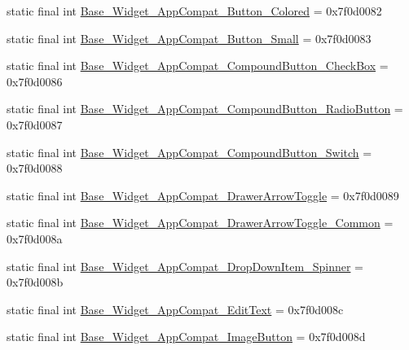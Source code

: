\begin{DoxyCompactItemize}
\item 
static final int \mbox{\hyperlink{classandroid_1_1support_1_1v7_1_1appcompat_1_1R_1_1style_ab8551a77e3c16b43a85d6159629087f6}{Base\+\_\+\+Widget\+\_\+\+App\+Compat\+\_\+\+Button\+\_\+\+Colored}} = 0x7f0d0082
\item 
static final int \mbox{\hyperlink{classandroid_1_1support_1_1v7_1_1appcompat_1_1R_1_1style_ae4b8bf3e528f1e685afe9dba173071ea}{Base\+\_\+\+Widget\+\_\+\+App\+Compat\+\_\+\+Button\+\_\+\+Small}} = 0x7f0d0083
\item 
static final int \mbox{\hyperlink{classandroid_1_1support_1_1v7_1_1appcompat_1_1R_1_1style_a73ef775f81633470d8a108c06b0e4274}{Base\+\_\+\+Widget\+\_\+\+App\+Compat\+\_\+\+Compound\+Button\+\_\+\+Check\+Box}} = 0x7f0d0086
\item 
static final int \mbox{\hyperlink{classandroid_1_1support_1_1v7_1_1appcompat_1_1R_1_1style_acbae6d6c74db639172d499065f47cb55}{Base\+\_\+\+Widget\+\_\+\+App\+Compat\+\_\+\+Compound\+Button\+\_\+\+Radio\+Button}} = 0x7f0d0087
\item 
static final int \mbox{\hyperlink{classandroid_1_1support_1_1v7_1_1appcompat_1_1R_1_1style_add3a6916e7c77510f29c2c1cbe208285}{Base\+\_\+\+Widget\+\_\+\+App\+Compat\+\_\+\+Compound\+Button\+\_\+\+Switch}} = 0x7f0d0088
\item 
static final int \mbox{\hyperlink{classandroid_1_1support_1_1v7_1_1appcompat_1_1R_1_1style_ac82ba537759e8daad392e766d595d175}{Base\+\_\+\+Widget\+\_\+\+App\+Compat\+\_\+\+Drawer\+Arrow\+Toggle}} = 0x7f0d0089
\item 
static final int \mbox{\hyperlink{classandroid_1_1support_1_1v7_1_1appcompat_1_1R_1_1style_a31ca1ef9f55174e1ef5873ac1cfb023b}{Base\+\_\+\+Widget\+\_\+\+App\+Compat\+\_\+\+Drawer\+Arrow\+Toggle\+\_\+\+Common}} = 0x7f0d008a
\item 
static final int \mbox{\hyperlink{classandroid_1_1support_1_1v7_1_1appcompat_1_1R_1_1style_a97a797d8997eff253a8e48da27e1e8a7}{Base\+\_\+\+Widget\+\_\+\+App\+Compat\+\_\+\+Drop\+Down\+Item\+\_\+\+Spinner}} = 0x7f0d008b
\item 
static final int \mbox{\hyperlink{classandroid_1_1support_1_1v7_1_1appcompat_1_1R_1_1style_aded95edb41cbd1388bd486866f151cd3}{Base\+\_\+\+Widget\+\_\+\+App\+Compat\+\_\+\+Edit\+Text}} = 0x7f0d008c
\item 
static final int \mbox{\hyperlink{classandroid_1_1support_1_1v7_1_1appcompat_1_1R_1_1style_a49ab8d062caa23ccaa5ffe51509381b2}{Base\+\_\+\+Widget\+\_\+\+App\+Compat\+\_\+\+Image\+Button}} = 0x7f0d008d
\item 

\end{DoxyCompactItemize}
